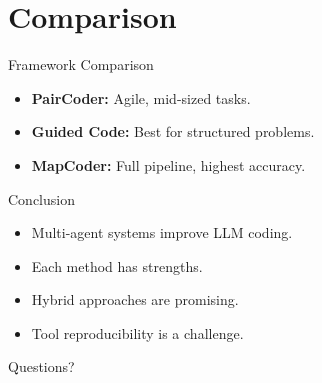 \documentclass{beamer}
\begin{document}
	\section{Comparison}
	\begin{frame}{Framework Comparison}
	  \begin{itemize}
	    \item \textbf{PairCoder:} Agile, mid-sized tasks.
	    \item \textbf{Guided Code:} Best for structured problems.
	    \item \textbf{MapCoder:} Full pipeline, highest accuracy.
	  \end{itemize}
	\end{frame}
	
	\begin{frame}{Conclusion}
	  \begin{itemize}
	    \item Multi-agent systems improve LLM coding.
	    \item Each method has strengths.
	    \item Hybrid approaches are promising.
	    \item Tool reproducibility is a challenge.
	  \end{itemize}
	\end{frame}
	
	\begin{frame}
	  \centering
	  \Huge Questions?
	\end{frame}
	
	
\end{document}
